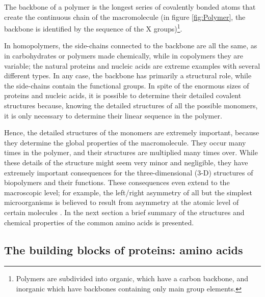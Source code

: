 The backbone of a polymer is the longest series of covalently bonded atoms that create the continuous chain of the macromolecule (in figure \ref{fig:Polymer}, the backbone is identified by the sequence of the X groups)\footnote{Polymers are subdivided into organic, which have a carbon backbone, and inorganic which have backbones containing only main group elements.}. %

In homopolymers, the side-chains connected to the backbone are all the same, as in carbohydrates or polymers made chemically, while in copolymers they are variable; the natural proteins and nucleic acids are extreme examples with several different types. In any case, the backbone has primarily a structural role, while the side-chains contain the functional groups. In spite of the enormous sizes of proteins and nucleic acids, it is possible to determine their detailed covalent structures because, knowing the detailed structures of all the possible monomers, it is only necessary to determine their linear sequence in the polymer.

Hence, the detailed structures of the monomers are extremely important, because they determine the global properties of the macromolecule. They occur many times in the polymer, and their structures are multiplied many times over. While these details of the structure might seem very minor and negligible, they have extremely important consequences for the three-dimensional (3-D) structures of biopolymers and their functions. These consequences even extend to the macroscopic level; for example, the left/right asymmetry of all but the simplest microorganisms is believed to result from asymmetry at the atomic level of certain molecules
\cite{creighton2010biophysical}. In the next section a brief summary of the structures and chemical properties of the common amino acids is presented. 

\subsection{The building blocks of proteins: amino acids}\label{ssec:amino-acids}


